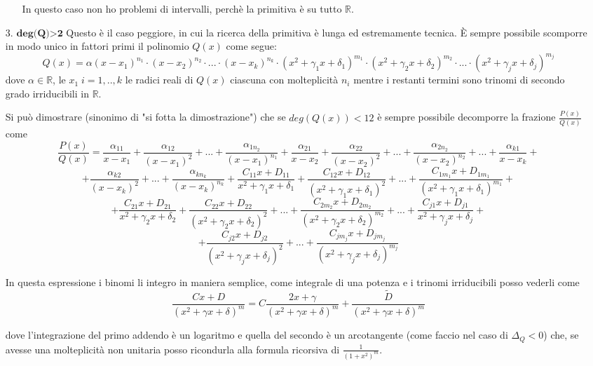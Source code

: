 \documentclass{article}
\theoremstyle{definition}
\theoremstyle{definition}
\theoremstyle{definition}
\theoremstyle{definition}
\theoremstyle{definition}
\begin{document}
\begin{itemize}
\begin{itemize}
                    In questo caso non ho problemi di intervalli, perchè la primitiva è su tutto $\mathbb{R}$.
                \end{itemize}
    \item [3.]  $\textbf{deg(Q)>2}$ Questo è il caso peggiore, in cui la ricerca della primitiva è lunga ed estremamente tecnica. È sempre possibile scomporre in modo  unico in fattori primi il polinomio $Q(x)$ come segue:
    \[Q(x)=\alpha(x-x_1)^{n_1}\cdot(x-x_2)^{n_2}\cdot...\cdot(x-x_k)^{n_k}\cdot(x^2+\gamma_1x+\delta_1)^{m_1}\cdot(x^2+\gamma_2x+\delta_2)^{m_2}\cdot...\cdot(x^2+\gamma_jx+\delta_j)^{m_j}\]
    dove $\alpha\in\mathbb{R}$, le $x_1 \; i=1,..,k$ le radici reali di $Q(x)$ ciascuna con molteplicità $n_i$ mentre i restanti termini sono trinomi di secondo grado irriducibili in $\mathbb{R}$.

    Si può dimostrare (sinonimo di "si fotta la dimostrazione") che se $deg(Q(x))<12$ è sempre possibile decomporre la frazione $\frac{P(x)}{Q(x)}$ come
    \[\frac{P(x)}{Q(x)}=\frac{\alpha_{11}}{x-x_1}+\frac{\alpha_{12}}{(x-x_1)^2}+...+\frac{\alpha_{1n_2}}{(x-x_1)^{n_1}}+\frac{\alpha_{21}}{x-x_2}+\frac{\alpha_{22}}{(x-x_2)^2}+...+\frac{\alpha_{2n_2}}{(x-x_2)^{n_2}}+...+\frac{\alpha_{k1}}{x-x_k}+\]
    \[+\frac{\alpha_{k2}}{(x-x_k)^2}+...+\frac{\alpha_{kn_k}}{(x-x_k)^{n_k}}+\frac{C_{11}x+D_{11}}{x^2+\gamma_1x+\delta_1}+\frac{C_{12}x+D_{12}}{(x^2+\gamma_1x+\delta_1)^2}+...+\frac{C_{1m_1}x+D_{1m_1}}{(x^2+\gamma_1x+\delta_1)^{m_1}}+\]
    \[+\frac{C_{21}x+D_{21}}{x^2+\gamma_2x+\delta_2}+\frac{C_{22}x+D_{22}}{(x^2+\gamma_2x+\delta_2)^2}+...+\frac{C_{2m_2}x+D_{2m_2}}{(x^2+\gamma_2x+\delta_2)^{m_2}}+...+\frac{C_{j1}x+D_{j1}}{x^2+\gamma_jx+\delta_j}+\]
    \[+\frac{C_{j2}x+D_{j2}}{(x^2+\gamma_jx+\delta_j)^2}+...+\frac{C_{jm_j}x+D_{jm_j}}{(x^2+\gamma_jx+\delta_j)^{m_j}}\]

    In questa espressione i binomi li integro in maniera semplice, come integrale di una potenza e i trinomi irriducibili posso vederli come
    \[\frac{Cx+D}{(x^2+\gamma x+\delta)^m}=C\frac{2x+\gamma}{(x^2+\gamma x+\delta)^m}+\frac{\tilde{D}}{(x^2+\gamma x+\delta)^m}\]

    dove l'integrazione del primo addendo è un logaritmo e quella del secondo è un arcotangente (come faccio nel caso di $\Delta_Q<0$) che, se avesse una molteplicità non unitaria posso ricondurla alla formula ricorsiva di $\displaystyle{\frac{1}{(1+x^2)^m}}$.

\end{itemize}
\end{document}
